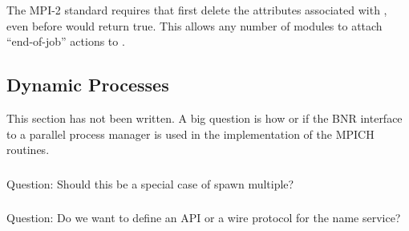 \documentclass{article}
\begin{document}
\subsubsection{}
The MPI-2 standard requires that  first delete the
attributes associated with , even before
 would return true.  This allows any number of
modules to attach ``end-of-job'' actions to .


\subsection{Dynamic Processes}

This section has not been written.  A big question is how or if the BNR
interface to a parallel process manager is used in the implementation
of the MPICH routines.  

\subsubsection{}

\subsubsection{}

\subsubsection{}

\subsubsection{}

\subsubsection{}
Question:  Should this be a special case of spawn multiple?

\subsubsection{}

\subsubsection{}
Question:  Do we want to define an API or a wire protocol for the name
service?
\end{document}
